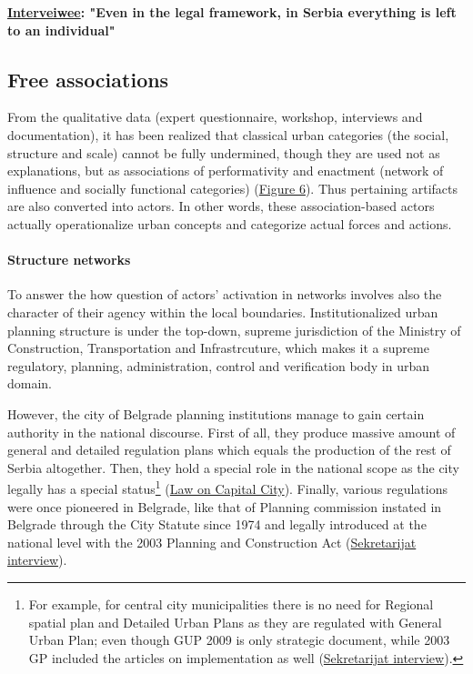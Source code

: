 \documentclass[11pt]{report}
\begin{document}
\textbf{\href{}{Interveiwee}:
"Even in the legal framework, in Serbia everything is left to an individual"}

\subsection{Free associations}

From the qualitative data (expert questionnaire, workshop, interviews and documentation), it has been realized that classical urban categories (the social, structure and scale) cannot be fully undermined, though they are used not as explanations, but as associations of performativity and enactment (network of influence and socially functional categories) (\href{}{Figure 6}).
Thus pertaining artifacts are also converted into actors.
In other words, these association-based actors actually operationalize urban concepts and categorize actual forces and actions.

\paragraph{Structure networks}

To answer the how question of actors' activation in networks involves also the character of their agency within the local boundaries.
Institutionalized urban planning structure is under the top-down, supreme jurisdiction of the Ministry of Construction, Transportation and Infrastrcuture, which makes it a supreme regulatory, planning, administration, control and verification body in urban domain.

However, the city of Belgrade planning institutions manage to gain certain authority in the national discourse.
First of all, they produce massive amount of general and detailed regulation plans which equals the production of the rest of Serbia altogether.
Then, they hold a special role in the national scope as the city legally has a special status\footnote
{For example, for central city municipalities there is no need for Regional spatial plan and Detailed Urban Plans as they are regulated with General Urban Plan; even though GUP 2009 is only strategic document, while 2003 GP included the articles on implementation as well (\href{}{Sekretarijat interview}).}
(\href{}{Law on Capital City}).
Finally, various regulations were once pioneered in Belgrade, like that of Planning commission instated in Belgrade through the City Statute since 1974 and legally introduced at the national level with the 2003 Planning and Construction Act (\href{}{Sekretarijat interview}).
\end{document}
